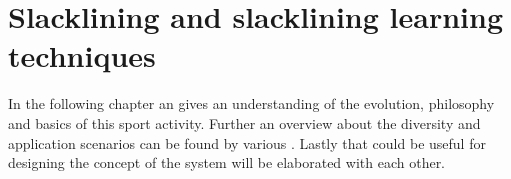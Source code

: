 \chapter{Slacklining  and slacklining learning techniques}\label{3_slacklining}
In the following chapter an \textbf{} gives an understanding of the evolution, philosophy and basics of this sport activity. Further an overview about the diversity and application scenarios can be found by various \textbf{}. Lastly \textbf{} that could be useful for designing the concept of the system will be elaborated with each other.
 

 
 
 